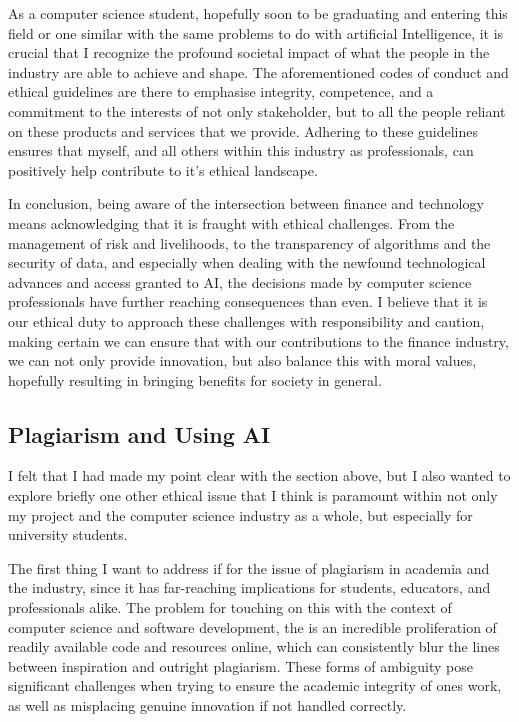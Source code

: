 \documentclass{article}
\begin{document}
As a computer science student, hopefully soon to be graduating and entering this field or one similar with the same problems to do with artificial Intelligence, it is crucial that I recognize the profound societal impact of what the people in the industry are able to achieve and shape. The aforementioned codes of conduct and ethical guidelines are there to emphasise integrity, competence, and a commitment to the interests of not only stakeholder, but to all the people reliant on these products and services that we provide. Adhering to these guidelines ensures that myself, and all others within this industry as professionals, can positively help contribute to it's ethical landscape.\\\vspace{0.3cm}

In conclusion, being aware of the intersection between finance and technology means acknowledging that it is fraught with ethical challenges. From the management of risk and livelihoods, to the transparency of algorithms and the security of data, and especially when dealing with the newfound technological advances and access granted to AI, the decisions made by computer science professionals have further reaching consequences than even. I believe that it is our ethical duty to approach these challenges with responsibility and caution, making certain we can ensure that with our contributions to the finance industry, we can not only provide innovation, but also balance this with moral values, hopefully resulting in bringing benefits for society in general.


\subsection{Plagiarism and Using AI}
I felt that I had made my point clear with the section above, but I also wanted to explore briefly one other ethical issue that I think is paramount within not only my project and the computer science industry as a whole, but especially for university students.\\\vspace{0.3cm}

The first thing I want to address if for the issue of plagiarism in academia and the industry, since it has far-reaching implications for students, educators, and professionals alike. The problem for touching on this with the context of computer science and software development, the is an incredible proliferation of readily available code and resources online, which can consistently blur the lines between inspiration and outright plagiarism. These forms of ambiguity pose significant challenges when trying to ensure the academic integrity of ones work, as well as misplacing genuine innovation if not handled correctly.\\\vspace{0.3cm}
\end{document}
